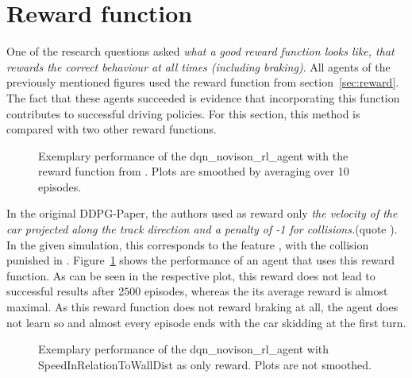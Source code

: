 \section{Reward function}

One of the research questions asked \textit{what a good reward function looks like, that rewards the \textit{correct} behaviour at all times (including braking)}. All agents of the previously mentioned figures used the reward function from section~\ref{sec:reward}. The fact that these agents succeeded is evidence that incorporating this function contributes to successful driving policies. For this section, this method is compared with two other reward functions. 

\begin{figure}[h]
	{%
		\setlength{\fboxsep}{0pt}%
		\setlength{\fboxrule}{1pt}%
	}%
	\centering
	\caption[Exemplary performance of the dqn\_novison\_rl\_agent with the reward function from \cite{lillicrap_continuous_2015}]{Exemplary performance of the dqn\_novison\_rl\_agent with the reward function from \cite{lillicrap_continuous_2015}. Plots are smoothed by averaging over 10 episodes.}
	\label{fig:dqnrewardspeedstuff}
\end{figure}

In the original DDPG-Paper, the authors used as reward only \textit{the velocity of the car projected along the track direction and a penalty of -1 for collisions.}(quote \cite{lillicrap_continuous_2015}). In the given simulation, this corresponds to the feature , with the collision punished in . Figure~\ref{fig:dqnrewardspeedstuff} shows the performance of an agent that uses this reward function. 
As can be seen in the respective plot, this reward does not lead to successful results after $2500$ episodes, whereas the its average reward is almost maximal. As this reward function does not reward braking at all, the agent does not learn so and almost every episode ends with the car skidding at the first turn.

\begin{figure}[h]
	{%
		\setlength{\fboxsep}{0pt}%
		\setlength{\fboxrule}{1pt}%
	}%
	\centering
	\caption[Exemplary performance of the dqn\_novison\_rl\_agent with SpeedInRelationToWallDist as only reward.]{Exemplary performance of the dqn\_novison\_rl\_agent with SpeedInRelationToWallDist as only reward. Plots are not smoothed.}
	\label{fig:dqnrewardinrelationtowall}
\end{figure}

